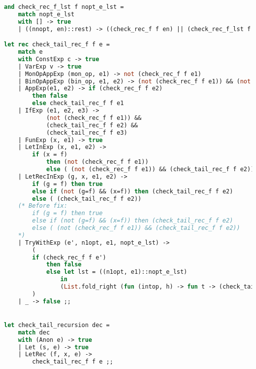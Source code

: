 \begin{lstlisting}[language=Caml, caption=Tail recursion for PicoML expressions]
and check_rec_f_lst f nopt_e_lst = 
    match nopt_e_lst 
    with [] -> true
    | ((nnopt, en)::rest) -> ((check_rec_f f en) || (check_rec_f_lst f rest));;

let rec check_tail_rec_f f e =
    match e
    with ConstExp c -> true
    | VarExp v -> true
    | MonOpAppExp (mon_op, e1) -> not (check_rec_f f e1)
    | BinOpAppExp (bin_op, e1, e2) -> (not (check_rec_f f e1)) && (not (check_rec_f f e2))
    | AppExp(e1, e2) -> if (check_rec_f f e2)
        then false
        else check_tail_rec_f f e1
    | IfExp (e1, e2, e3) -> 
            (not (check_rec_f f e1)) &&
            (check_tail_rec_f f e2) && 
            (check_tail_rec_f f e3)
    | FunExp (x, e1) -> true
    | LetInExp (x, e1, e2) ->
        if (x = f) 
            then (not (check_rec_f f e1))
            else ( (not (check_rec_f f e1)) && (check_tail_rec_f f e2))
    | LetRecInExp (g, x, e1, e2) ->
        if (g = f) then true
        else if (not (g=f) && (x=f)) then (check_tail_rec_f f e2)
        else ( (check_tail_rec_f f e2))
    (* Before fix:
        if (g = f) then true
        else if (not (g=f) && (x=f)) then (check_tail_rec_f f e2)
        else ( (not (check_rec_f f e1)) && (check_tail_rec_f f e2))
    *)
    | TryWithExp (e', n1opt, e1, nopt_e_lst) ->
        (
        if (check_rec_f f e')
            then false
            else let lst = ((n1opt, e1)::nopt_e_lst)
                in
                (List.fold_right (fun (intop, h) -> fun t -> (check_tail_rec_f f h) && t) lst true) 
        )
    | _ -> false ;;


let check_tail_recursion dec =
    match dec
    with (Anon e) -> true
    | Let (s, e) -> true
    | LetRec (f, x, e) ->
        check_tail_rec_f f e ;;
\end{lstlisting}